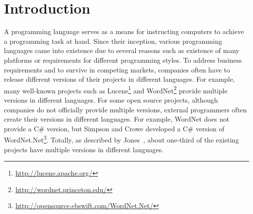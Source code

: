 \section{Introduction}
\label{sec:introduction}

A programming language serves as a means for instructing computers
to achieve a programming task at hand. Since their inception,
various programming languages came into existence due to several
reasons such as existence of many platforms or requirements for
different programming styles.  To address business requirements
and to survive in competing markets, companies often have to release
different versions of their projects in different languages. For
example, many well-known projects such as
Lucene\footnote{\url{http://lucene.apache.org/}} and
WordNet\footnote{\url{http://wordnet.princeton.edu/}} provide
multiple versions in different languages. For some open source
projects, although companies do not officially provide multiple
versions, external programmers often create their versions in
different languages. For example, WordNet does not provide a C\#
version, but Simpson and Crowe developed a C\# version of
WordNet.Net\footnote{\url{http://opensource.ebswift.com/WordNet.Net/}}.
Totally, as described by Jones~\cite{jones1998estimating}, about
one-third of the existing projects have multiple versions in
different languages.


